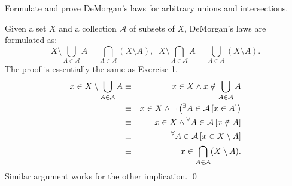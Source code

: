 \documentclass[a4paper,12pt]{article}
\begin{document}
\begin{exe}
	Formulate and prove DeMorgan's laws for arbitrary unions and intersections.
\end{exe}\begin{sol}
	Given a set \( X \) and a collection \( \mathcal{A}\) of subsets of \( X \),
	DeMorgan's laws are formulated as:
	\begin{equation*}
		X \setminus \bigcup_{A \in \mathcal{A}} A
		=
		\bigcap_{A \in \mathcal{A}}(X\setminus A),\;\;
		X \setminus \bigcap_{A \in \mathcal{A}} A
		=
		\bigcup_{A \in \mathcal{A}}(X\setminus A).
	\end{equation*}
	The proof is essentially the same as Exercise 1.
	\begin{eqnarray*}
		x\in X \setminus \bigcup_{A \in \mathcal{A}} A
		&\equiv&
		x \in X
		\wedge
		x \notin \bigcup_{A \in \mathcal{A}} A\\
		&\equiv&
		x \in X
		\wedge
		\neg \left( {}^{\exists}A \in \mathcal{A}\left[  x \in A \right] \right)\\
		&\equiv&
		x \in X
		\wedge
		{}^{\forall} A \in \mathcal{A}\left[  x \notin A \right]\\
		&\equiv&
		{}^{\forall} A \in \mathcal{A}\left[  x \in X \setminus A \right]\\
		&\equiv&
		x \in \bigcap_{A \in \mathcal{A}}(X\setminus A).
	\end{eqnarray*}
	Similar argument works for the other implication.
	\qed\end{sol}
\end{document}

